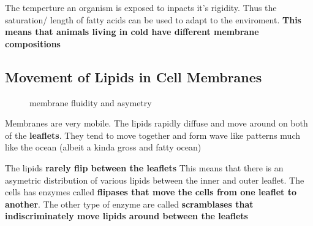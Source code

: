 \documentclass[../main.tex]{subfiles}
\begin{document}
        The temperture an organism is exposed to inpacts it's rigidity. Thus the saturation/ length of fatty acids can be used to adapt to the enviroment. \textbf{This means that animals living in cold have different membrane compositions}


    \subsection{Movement of Lipids in Cell Membranes}
        \begin{figure}[H]
            \centering
            \hspace{0.05\textwidth} %
            \caption{membrane fluidity and asymetry}
            \label{fig:}
        \end{figure}


        
        Membranes are very mobile. The lipids rapidly diffuse and move around on both of the \textbf{leaflets}. They tend to move together and form wave like patterns much like the ocean (albeit a kinda gross and fatty ocean)
        \par
        The lipids \textbf{rarely flip between the leaflets} This means that there is an asymetric distribution of various lipids between the inner and outer leaflet. The cells has enzymes called\textbf{ flipases that move the cells from one leaflet to another}. The other type of enzyme are called \textbf{scramblases that indiscriminately move lipids around between the leaflets}
\end{document}
